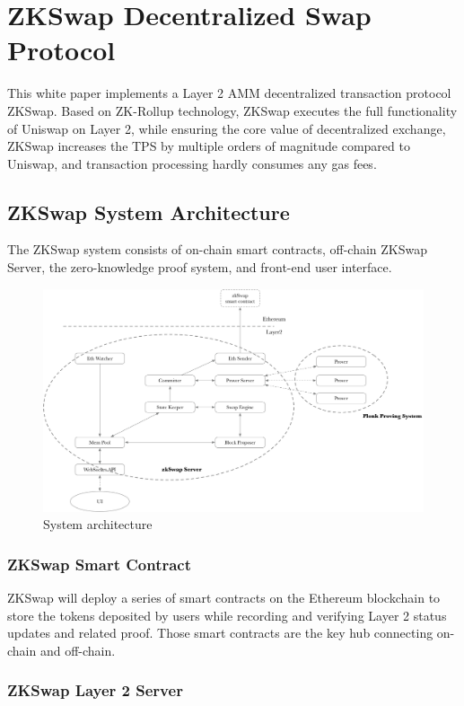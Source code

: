 \documentclass[]{template/llncs}
\begin{document}
\section{ZKSwap Decentralized Swap Protocol}

This white paper implements a Layer 2 AMM decentralized transaction protocol ZKSwap. Based on ZK-Rollup technology, ZKSwap executes the full functionality of Uniswap on Layer 2, while ensuring the core value of decentralized exchange, ZKSwap increases the TPS by multiple orders of magnitude compared to Uniswap, and transaction processing hardly consumes any gas fees.

\subsection{ZKSwap System Architecture}

The ZKSwap system consists of on-chain smart contracts, off-chain ZKSwap Server, the zero-knowledge proof system, and front-end user interface.

\begin{figure}[htbp]
\centering
\includegraphics[width=0.9\columnwidth]{figure/arch}
\caption{System architecture}
\label{fig:arch}
\end{figure}

\subsubsection{ZKSwap Smart Contract}

ZKSwap will deploy a series of smart contracts on the Ethereum blockchain to store the tokens deposited by users while recording and verifying Layer 2 status updates and related proof. Those smart contracts are the key hub connecting on-chain and off-chain.


\subsubsection{ZKSwap Layer 2 Server}
\end{document}
